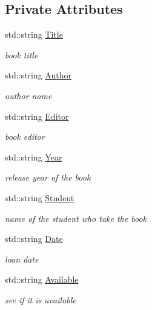\subsection*{Private Attributes}
\begin{DoxyCompactItemize}
\item 
std\+::string \hyperlink{classBook_a862b94a2fd16ac90209afa4393d8df8a}{Title}
\begin{DoxyCompactList}\small\item\em book title \end{DoxyCompactList}\item 
std\+::string \hyperlink{classBook_a12872f571d8e7c5bfa31f4142e7848eb}{Author}
\begin{DoxyCompactList}\small\item\em author name \end{DoxyCompactList}\item 
std\+::string \hyperlink{classBook_a18602b69a54cf1533569ac857681b03f}{Editor}
\begin{DoxyCompactList}\small\item\em book editor \end{DoxyCompactList}\item 
std\+::string \hyperlink{classBook_ad3fc2c944e788d179c4d836f36662ae2}{Year}
\begin{DoxyCompactList}\small\item\em release year of the book \end{DoxyCompactList}\item 
std\+::string \hyperlink{classBook_ae89daf9343a917dced86da884961ed3a}{Student}
\begin{DoxyCompactList}\small\item\em name of the student who take the book \end{DoxyCompactList}\item 
std\+::string \hyperlink{classBook_a45a1a5f93a5ec021cc605b0c905d1d6f}{Date}
\begin{DoxyCompactList}\small\item\em loan date \end{DoxyCompactList}\item 
std\+::string \hyperlink{classBook_ae5f0bbe5fb49a8cd68bfc77a59afed36}{Available}
\begin{DoxyCompactList}\small\item\em see if it is available \end{DoxyCompactList}\end{DoxyCompactItemize}



